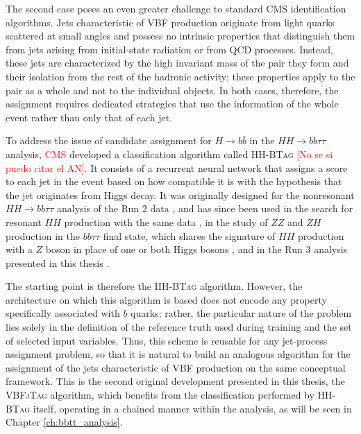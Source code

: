 The second case poses an even greater challenge to standard CMS identification algorithms. Jets characteristic of VBF production originate from light quarks scattered at small angles and possess no intrinsic properties that distinguish them from jets arising from initial-state radiation or from QCD processes. Instead, these jets are characterized by the high invariant mass of the pair they form and their isolation from the rest of the hadronic activity; these properties apply to the pair as a whole and not to the individual objects. In both cases, therefore, the assignment requires dedicated strategies that use the information of the whole event rather than only that of each jet.\medskip

To address the issue of candidate assignment for $H\rightarrow b\bar{b}$ in the $HH\rightarrow bb\tau\tau$ analysis, \textcolor{red}{CMS} developed a classification algorithm called \textsc{HH-BTag} \textcolor{red}{\cite{CMS-HIG-20-010,HHBTag}}\textcolor{red}{[No se si puedo citar el AN]}. It consists of a recurrent neural network that assigns a score to each jet in the event based on how compatible it is with the hypothesis that the jet originates from Higgs decay. It was originally designed for the nonresonant $HH\rightarrow bb\tau\tau$ analysis of the Run 2 data \cite{CMS-HIG-20-010}, and has since been used in the search for resonant $HH$ production with the same data \cite{CMS-PAS-B2G-24-011}, in the study of $ZZ$ and $ZH$ production in the $bb\tau\tau$ final state, which shares the signature of $HH$ production with a $Z$ boson in place of one or both Higgs bosons \cite{CMS:2026zzzh}, and in the Run 3 analysis presented in this thesis \cite{CMS-PAS-HIG-25-008}.


The starting point is therefore the \textsc{HH-BTag} algorithm. However, the architecture on which this algorithm is based does not encode any property specifically associated with $b$ quarks; rather, the particular nature of the problem lies solely in the definition of the reference truth used during training and the set of selected input variables. Thus, this scheme is reusable for any jet-process assignment problem, so that it is natural to build an analogous algorithm for the assignment of the jets characteristic of VBF production on the same conceptual framework. This is the second original development presented in this thesis, the \textsc{VBFjTag} algorithm, which benefits from the classification performed by \textsc{HH-BTag} itself, operating in a chained manner within the analysis, as will be seen in Chapter \ref{ch:bbtt_analysis}.\medskip

